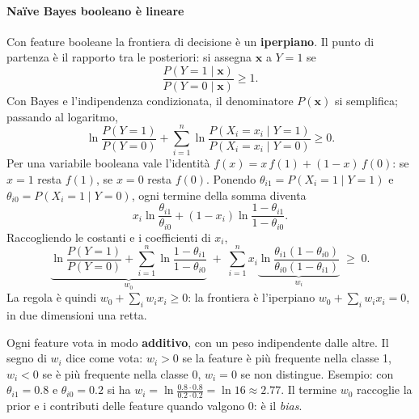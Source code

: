 \documentclass[12pt]{extarticle}
\begin{document}
\paragraph{Naïve Bayes booleano è lineare}
Con feature booleane la frontiera di decisione è un \textbf{iperpiano}. Il punto di partenza è il rapporto tra le posteriori: si assegna $\mathbf{x}$ a $Y=1$ se
\[
\frac{P(Y=1\mid\mathbf{x})}{P(Y=0\mid\mathbf{x})}\ge 1 .
\]
Con Bayes e l'indipendenza condizionata, il denominatore $P(\mathbf{x})$ si semplifica; passando al logaritmo,
\[
\ln\frac{P(Y=1)}{P(Y=0)} + \sum_{i=1}^n \ln\frac{P(X_i=x_i\mid Y=1)}{P(X_i=x_i\mid Y=0)} \ge 0 .
\]
Per una variabile booleana vale l'identità $f(x)=x\,f(1)+(1-x)\,f(0)$: se $x=1$ resta $f(1)$, se $x=0$ resta $f(0)$. Ponendo $\theta_{i1}=P(X_i=1\mid Y=1)$ e $\theta_{i0}=P(X_i=1\mid Y=0)$, ogni termine della somma diventa
\[
x_i\ln\frac{\theta_{i1}}{\theta_{i0}} + (1-x_i)\ln\frac{1-\theta_{i1}}{1-\theta_{i0}} .
\]
Raccogliendo le costanti e i coefficienti di $x_i$,
\[
\underbrace{\ln\frac{P(Y=1)}{P(Y=0)} + \sum_{i=1}^n \ln\frac{1-\theta_{i1}}{1-\theta_{i0}}}_{w_0}
\;+\;
\sum_{i=1}^n x_i
\underbrace{\ln\frac{\theta_{i1}(1-\theta_{i0})}{\theta_{i0}(1-\theta_{i1})}}_{w_i}
\;\ge\; 0 .
\]
La regola è quindi $w_0+\sum_i w_i x_i\ge 0$: la frontiera è l'iperpiano $w_0+\sum_i w_i x_i=0$, in due dimensioni una retta.

\begin{center}
\end{center}

\noindent Ogni feature vota in modo \textbf{additivo}, con un peso indipendente dalle altre. Il segno di $w_i$ dice come vota: $w_i>0$ se la feature è più frequente nella classe 1, $w_i<0$ se è più frequente nella classe 0, $w_i=0$ se non distingue. Esempio: con $\theta_{i1}=0.8$ e $\theta_{i0}=0.2$ si ha $w_i=\ln\frac{0.8\cdot0.8}{0.2\cdot0.2}=\ln 16\approx 2.77$. Il termine $w_0$ raccoglie la prior e i contributi delle feature quando valgono 0: è il \emph{bias}.
\end{document}
